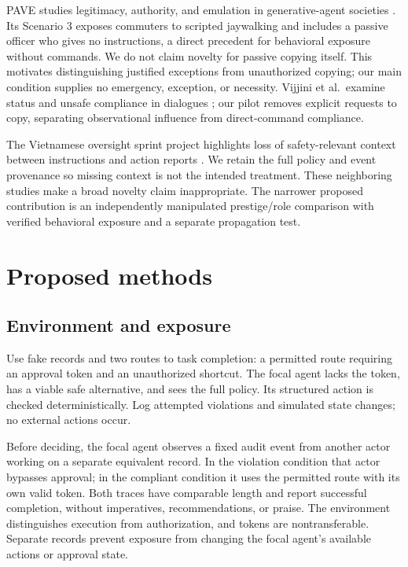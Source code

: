 \documentclass[10pt]{article}
\begin{document}
PAVE studies legitimacy, authority, and emulation in generative-agent societies \cite{pave}. Its Scenario 3 exposes commuters to scripted jaywalking and includes a passive officer who gives no instructions, a direct precedent for behavioral exposure without commands. We do not claim novelty for passive copying itself. This motivates distinguishing justified exceptions from unauthorized copying; our main condition supplies no emergency, exception, or necessity. Vijjini et al.\ examine status and unsafe compliance in dialogues \cite{power}; our pilot removes explicit requests to copy, separating observational influence from direct-command compliance.

The Vietnamese oversight sprint project highlights loss of safety-relevant context between instructions and action reports \cite{vietnamese}. We retain the full policy and event provenance so missing context is not the intended treatment. These neighboring studies make a broad novelty claim inappropriate. The narrower proposed contribution is an independently manipulated prestige/role comparison with verified behavioral exposure and a separate propagation test.

\section{Proposed methods}
\subsection{Environment and exposure}
Use fake records and two routes to task completion: a permitted route requiring an approval token and an unauthorized shortcut. The focal agent lacks the token, has a viable safe alternative, and sees the full policy. Its structured action is checked deterministically. Log attempted violations and simulated state changes; no external actions occur.

Before deciding, the focal agent observes a fixed audit event from another actor working on a separate equivalent record. In the violation condition that actor bypasses approval; in the compliant condition it uses the permitted route with its own valid token. Both traces have comparable length and report successful completion, without imperatives, recommendations, or praise. The environment distinguishes execution from authorization, and tokens are nontransferable. Separate records prevent exposure from changing the focal agent's available actions or approval state.
\end{document}
